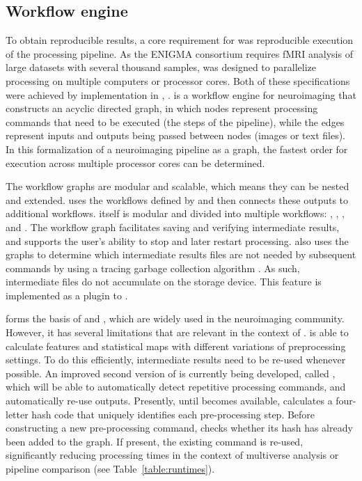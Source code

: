 \subsection{Workflow engine}

To obtain reproducible results, a core requirement for  was reproducible execution of the processing pipeline. As the ENIGMA consortium requires fMRI analysis of large datasets with several thousand samples,  was designed to parallelize processing on multiple computers or processor cores. Both of these specifications were achieved by implementation in ,  \parencite{gorgolewski2011}.  is a workflow engine for neuroimaging that constructs an acyclic directed graph, in which nodes represent processing commands that need to be executed (the steps of the pipeline), while the edges represent inputs and outputs being passed between nodes (images or text files). In this formalization of a neuroimaging pipeline as a graph, the fastest order for execution across multiple processor cores can be determined.

The workflow graphs are modular and scalable, which means they can be nested and extended.  uses the workflows defined by  and then connects these outputs to additional workflows.  itself is modular and divided into multiple workflows:  \parencite{esteban2021b},  \parencite{esteban2020a},  \parencite{esteban2021a}, and  \parencite{goncalves2021}. The workflow graph facilitates saving and verifying intermediate results, and supports the user's ability to stop and later restart processing.  also uses the graphs to determine which intermediate results files are not needed by subsequent commands by using a tracing garbage collection algorithm \parencite{dijkstra1978}. As such, intermediate files do not accumulate on the storage device. This feature is implemented as a plugin to .

 forms the basis of  and , which are widely used in the neuroimaging community. However, it has several limitations that are relevant in the context of .  is able to calculate features and statistical maps with different variations of preprocessing settings. To do this efficiently, intermediate results need to be re-used whenever possible. An improved second version of  is currently being developed, called  \parencite{jarecka2020}, which will be able to automatically detect repetitive processing commands, and automatically re-use outputs. Presently, until  becomes available,  calculates a four-letter hash code that uniquely identifies each pre-processing step. Before constructing a new pre-processing command,  checks whether its hash has already been added to the graph. If present, the existing command is re-used, significantly reducing processing times in the context of multiverse analysis or pipeline comparison (see Table~\ref{table:runtimes}).

